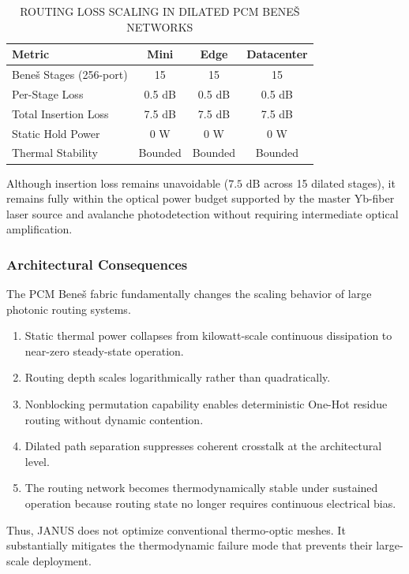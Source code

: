 \documentclass[journal]{IEEEtran}
\begin{document}
\begin{table}[htbp]
\centering
\small
\setlength{\tabcolsep}{3pt}
\caption{ROUTING LOSS SCALING IN DILATED PCM BENE\v{S} NETWORKS}
\label{tab:table6}
\begin{tabular}{lccc}
\toprule
Metric & Mini & Edge & Datacenter \\
\midrule
Bene\v{s} Stages (256-port) & 15 & 15 & 15 \\
Per-Stage Loss & 0.5 dB & 0.5 dB & 0.5 dB \\
Total Insertion Loss & 7.5 dB & 7.5 dB & 7.5 dB \\
Static Hold Power & 0 W & 0 W & 0 W \\
Thermal Stability & Bounded & Bounded & Bounded \\
\bottomrule
\end{tabular}
\end{table}

Although insertion loss remains unavoidable ($7.5\text{ dB}$ across 15 dilated stages), it remains fully within the optical power budget supported by the master Yb-fiber laser source and avalanche photodetection without requiring intermediate optical amplification.

\subsubsection{\textbf{Architectural Consequences}}

The PCM Beneš fabric fundamentally changes the scaling behavior of large photonic routing systems.

\begin{enumerate}
\item Static thermal power collapses from kilowatt-scale continuous dissipation to near-zero steady-state operation.
\item Routing depth scales logarithmically rather than quadratically.
\item Nonblocking permutation capability enables deterministic One-Hot residue routing without dynamic contention.
\item Dilated path separation suppresses coherent crosstalk at the architectural level.
\item The routing network becomes thermodynamically stable under sustained operation because routing state no longer requires continuous electrical bias.
\end{enumerate}

Thus, JANUS does not optimize conventional thermo-optic meshes. It substantially mitigates the thermodynamic failure mode
that prevents their large-scale deployment.
\end{document}
